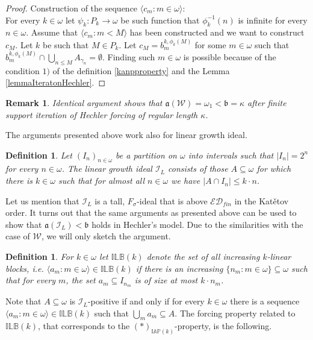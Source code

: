 \documentclass[a4paper]{amsart}
\newtheorem*{remark}{Remark}
\newtheorem{definition}[theorem]{Definition}
\newcommand{\aaa}{\mathfrak{a}}
\newcommand{\bbb}{\mathfrak{b}}
\newcommand{\ED}{\mathcal{ED}}
\newcommand{\WANDER}{\mathcal{W}}
\newcommand{\IAP}{\mathbb{IAP}}
\newcommand{\ILB}{\mathbb{ILB}}
\begin{document}
\begin{proof}
    Construction of the sequence $\langle c_{m}:m\in\omega\rangle$:\\
    For every $k\in\omega$ let $\psi_{k}:P_{k}\rightarrow \omega$ be such function that $\phi^{-1}_{k}(n)$ is infinite for every $n\in\omega$. Assume that $\langle c_{m}:m<M\rangle$ has been constructed and we want to construct $c_{M}$. Let $k$ be such that $M\in P_{k}$. Let $c_{M}=b^{k,\phi_{k}(M)}_{m}$ for some $m\in\omega$ such that $b^{k,\phi_{k}(M)}_{m}\cap \bigcup_{n\leq M}A_{\gamma_{n}}=\emptyset$. Finding such $m\in\omega$ is possible because of the condition $1)$ of the definition \ref{kanpproperty} and the Lemma \ref{lemmaIteratonHechler}.
\end{proof}
\begin{remark}
    Identical argument shows that $\aaa(\WANDER)=\omega_{1}<\bbb=\kappa$ after finite support iteration of Hechler forcing of regular length $\kappa$.
\end{remark}
The arguments presented above work also for linear growth ideal.
\begin{definition}
    Let $(I_{n})_{n\in\omega}$ be a partition on $\omega$ into intervals such that $|I_{n}|=2^{n}$ for every $n\in\omega$. The linear growth ideal $\mathcal{I}_{L}$ consists of those $A\subseteq\omega$ for which there is $k\in\omega$ such that for almost all $n\in\omega$ we have $|A\cap I_{n}|\leq k\cdot n$.
\end{definition}
Let us mention that $\mathcal{I}_{L}$ is a tall, $F_{\sigma}$-ideal that is above $\ED_{fin}$ in the Katětov order. It turns out that the same arguments as presented above can be used to show that $\aaa(\mathcal{I}_{L})<\bbb$ holds in Hechler's model. Due to the similarities with the case of $\WANDER$, we will only sketch the argument.
\begin{definition}
    For $k\in\omega$ let $\ILB(k)$ denote the set of all increasing $k$-linear blocks, i.e. $\langle a_{m}:m\in\omega\rangle\in \ILB(k)$ if there is an increasing $\{n_{m}:m\in\omega\}\subseteq\omega$ such that for every $m$, the set $a_{m}\subseteq I_{n_{m}}$ is of size at most $k\cdot n_{m}$.
\end{definition}
Note that $A\subseteq\omega$ is $\mathcal{I}_{L}$-positive if and only if for every $k\in\omega$ there is a sequence $\langle a_{m}:m\in\omega\rangle\in \ILB(k)$ such that $\bigcup_{m}a_{m}\subseteq A$. The forcing property related to $\ILB(k)$, that corresponds to the $(*)_{\IAP(k)}$-property, is the following.
\end{document}
